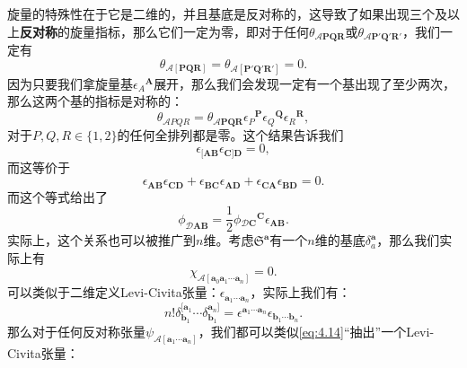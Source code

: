 旋量的特殊性在于它是二维的，并且基底是反对称的，这导致了如果出现三个及以上\textbf{反对称}的旋量指标，那么它们一定为零，即对于任何$\theta _{\mathcal{A}\boldsymbol{PQR}}$或$\theta _{\mathcal{A}\boldsymbol{P} '\boldsymbol{Q} '\boldsymbol{R} '}$，我们一定有
\begin{equation*}
	\theta _{\mathcal{A}[\boldsymbol{PQR}]} =\theta _{\mathcal{A}[\boldsymbol{P} '\boldsymbol{Q} '\boldsymbol{R} ']} =0.
\end{equation*}
因为只要我们拿旋量基$\epsilon {_{A}}^{\boldsymbol{A}}$展开，那么我们会发现一定有一个基出现了至少两次，那么这两个基的指标是对称的：
\begin{equation*}
	\theta _{\mathcal{A} PQR} =\theta _{\mathcal{A}\boldsymbol{PQR}} \epsilon {_{P}}^{\boldsymbol{P}} \epsilon {_{Q}}^{\boldsymbol{Q}} \epsilon {_{R}}^{\boldsymbol{R}} ,
\end{equation*}
对于$P,Q,R\in \{1,2\}$的任何全排列都是零。这个结果告诉我们
\begin{equation*}
	\epsilon _{[\boldsymbol{AB}} \epsilon _{\boldsymbol{C}]\boldsymbol{D}} =0,
\end{equation*}
而这等价于
\begin{equation*}
	\epsilon _{\boldsymbol{AB}} \epsilon _{\boldsymbol{CD}} +\epsilon _{\boldsymbol{BC}} \epsilon _{\boldsymbol{AD}} +\epsilon _{\boldsymbol{CA}} \epsilon _{\boldsymbol{BD}} =0.
\end{equation*}
而这个等式给出了
\begin{equation}
	\phi _{\mathcal{D}\boldsymbol{AB}} =\frac{1}{2} \phi {_{\mathcal{D}\boldsymbol{C}}}^{\boldsymbol{C}} \epsilon _{\boldsymbol{AB}} .
	\label{eq:4.14}
\end{equation}
实际上，这个关系也可以被推广到$n$维。考虑$\mathfrak{S}^{\boldsymbol{a}}$有一个$n$维的基底$\delta _{a}^{\boldsymbol{a}}$，那么我们实际上有
\begin{equation*}
	\chi _{\mathcal{A}[\boldsymbol{a}_{0}\boldsymbol{a}_{1} \cdots \boldsymbol{a}_{n}]} =0.
\end{equation*}
可以类似于二维定义Levi-Civita张量：$\epsilon _{\boldsymbol{a}_{1} \cdots \boldsymbol{a}_{n}}$，实际上我们有：
\begin{equation}
	n!\delta _{\boldsymbol{b}_{1}}^{[\boldsymbol{a}_{1}} \cdots \delta _{\boldsymbol{b}_{1}}^{\boldsymbol{a}_{n}]} =\epsilon ^{\boldsymbol{a}_{1} \cdots \boldsymbol{a}_{n}} \epsilon _{\boldsymbol{b}_{1} \cdots \boldsymbol{b}_{n}} .
	\label{eq:4.15}
\end{equation}
那么对于任何反对称张量$\psi _{\mathcal{A}[\boldsymbol{a}_{1} \cdots \boldsymbol{a}_{n}]}$，我们都可以类似\ref{eq:4.14}“抽出”一个Levi-Civita张量：
